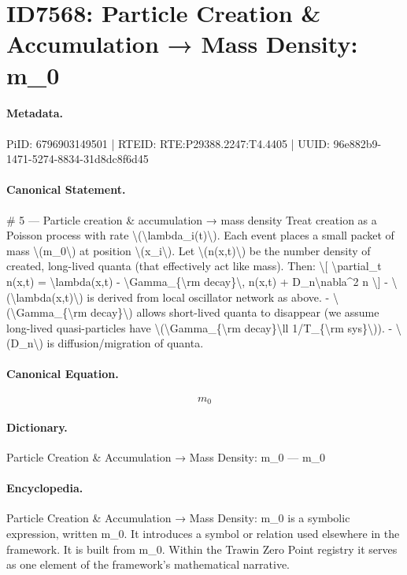\section*{ID7568: Particle Creation \& Accumulation → Mass Density: m\_0}
\paragraph{Metadata.}
PiID: 6796903149501 | RTEID: RTE:P29388.2247:T4.4405 | UUID: 96e882b9-1471-5274-8834-31d8dc8f6d45

\paragraph{Canonical Statement.}
\# 5 — Particle creation \& accumulation → mass density Treat creation as a Poisson process with rate \textbackslash{}(\textbackslash{}lambda\_i(t)\textbackslash{}). Each event places a small packet of mass \textbackslash{}(m\_0\textbackslash{}) at position \textbackslash{}(x\_i\textbackslash{}). Let \textbackslash{}(n(x,t)\textbackslash{}) be the number density of created, long-lived quanta (that effectively act like mass). Then: \textbackslash{}[ \textbackslash{}partial\_t n(x,t) = \textbackslash{}lambda(x,t) - \textbackslash{}Gamma\_\{\textbackslash{}rm decay\}\textbackslash{}, n(x,t) + D\_n\textbackslash{}nabla\textasciicircum{}2 n \textbackslash{}] - \textbackslash{}(\textbackslash{}lambda(x,t)\textbackslash{}) is derived from local oscillator network as above. - \textbackslash{}(\textbackslash{}Gamma\_\{\textbackslash{}rm decay\}\textbackslash{}) allows short-lived quanta to disappear (we assume long-lived quasi-particles have \textbackslash{}(\textbackslash{}Gamma\_\{\textbackslash{}rm decay\}\textbackslash{}ll 1/T\_\{\textbackslash{}rm sys\}\textbackslash{})). - \textbackslash{}(D\_n\textbackslash{}) is diffusion/migration of quanta.

\paragraph{Canonical Equation.}
\[
m_0
\]

\paragraph{Dictionary.}
Particle Creation \& Accumulation → Mass Density: m\_0 — m\_0

\paragraph{Encyclopedia.}
Particle Creation \& Accumulation → Mass Density: m\_0 is a symbolic expression, written m\_0. It introduces a symbol or relation used elsewhere in the framework. It is built from m\_0. Within the Trawin Zero Point registry it serves as one element of the framework's mathematical narrative.
